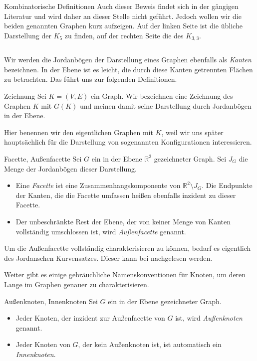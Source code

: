 \begin{section}{Kombinatorische Definitionen}
  Auch dieser Beweis findet sich in der gängigen Literatur und wird daher an dieser Stelle nicht geführt. Jedoch wollen wir die beiden genannten Graphen kurz aufzeigen. Auf der linken Seite ist die übliche Darstellung der $K_5$ zu finden, auf der rechten Seite die des $K_{3,3}$.
  
  \[  \]

  Wir werden die Jordanbögen der Darstellung eines Graphen ebenfalls als \textit{Kanten} bezeichnen. In der Ebene ist es leicht, die durch diese Kanten getrennten Flächen zu betrachten. Das führt uns zur folgenden Definitionen.
  
  \begin{definition}{Zeichnung}
    Sei $K=(V,E)$ ein Graph. Wir bezeichnen eine Zeichnung des Graphen $K$ mit $G(K)$ und meinen damit seine Darstellung durch Jordanbögen in der Ebene.
  \end{definition}
  
  Hier benennen wir den eigentlichen Graphen mit $K$, weil wir uns später hauptsächlich für die Darstellung von sogenannten Konfigurationen interessieren.

  \begin{definition}{Facette, Außenfacette}
   Sei $G$ ein in der Ebene $\mathbb{R}^2$ gezeichneter Graph. Sei $J_G$ die Menge der Jordanbögen dieser Darstellung.
   \begin{itemize}
   \item Eine \textit{Facette} ist eine Zusammenhangskomponente von $\mathbb{R}^2 \setminus J_G$. Die Endpunkte der Kanten, die die Facette umfassen heißen ebenfalls inzident zu dieser Facette. 
   \item Der unbeschränkte Rest der Ebene, der von keiner Menge von Kanten vollständig umschlossen ist, wird \textit{Außenfacette} genannt.
   \end{itemize}
  \end{definition}
  
  Um die Außenfacette vollständig charakterisieren zu können, bedarf es eigentlich des Jordanschen Kurvensatzes. Dieser kann bei \cite[Seite 53]{fritsch} nachgelesen werden.
  
  Weiter gibt es einige gebräuchliche Namenskonventionen für Knoten, um deren Lange im Graphen genauer zu charakterisieren.
  
  \begin{definition}{Außenknoten, Innenknoten}
   Sei $G$ ein in der Ebene gezeichneter Graph.
   \begin{itemize}
    \item Jeder Knoten, der inzident zur Außenfacette von $G$ ist, wird \textit{Außenknoten} genannt.
    \item Jeder Knoten von $G$, der kein Außenknoten ist, ist automatisch ein \textit{Innenknoten}.
   \end{itemize}


\end{definition}
\end{section}
